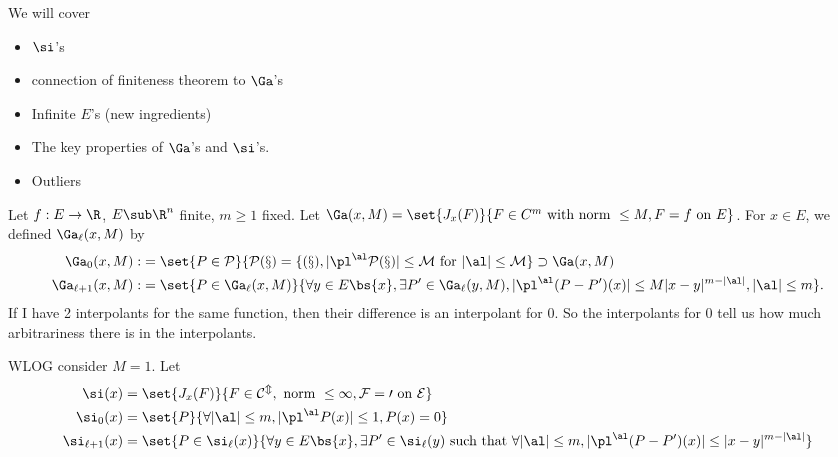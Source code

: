 
We will cover
\begin{itemize}
\item
$\si$'s
\item
connection of finiteness theorem to $\Ga$'s
\item
Infinite $E$'s (new ingredients)
\item
The key properties of $\Ga$'s and $\si$'s.
\item 
Outliers
\end{itemize}

Let $f:E\to \R$, $E\sub \R^n$ finite, $m\ge 1$ fixed. Let $\Ga(x,M) = \set{J_x(F)}{F\in C^m \text{ with norm }\le M, F=f\text{ on }E}$. For $x\in E$, we defined $\Ga_\ell (x,M)$ by 
\begin{align}
\Ga_0(x,M) :&= \set{P\in \cal P}{P(x)=f(x), |\pl^\al P(x)|\le M\text{ for }|\al|\le M}\supset \Ga(x,M)\\
\Ga_{\ell+1}(x,M) :&= 
\set{P\in \Ga_\ell(x,M)}{\forall y\in E\bs \{x\}, \exists P'\in \Ga_\ell(y,M), |\pl^\al(P-P')(x)|\le M|x-y|^{m-|\al|}, |\al|\le m}.
\end{align}
If I have 2 interpolants for the same function, then their difference is an interpolant for 0. So the interpolants for 0 tell us how much arbitrariness there is in the interpolants. 

WLOG consider $M=1$.
Let 
\begin{align}
\si(x) &= \set{J_x(F)}{F\in \cal C^m, \text{ norm }\le 1, F=0\text{ on }E}\\
\si_0(x) &=\set{P}{\forall |\al|\le m,|\pl^\al P(x)|\le 1, P(x)=0}\\
\si_{\ell+1}(x)&=\set{P\in \si_\ell(x)}{\forall y\in E\bs \{x\}, \exists P'\in \si_\ell(y)\text{ such that }\forall |\al|\le m, |\pl^\al(P-P')(x)|\le |x-y|^{m-|\al|}}
\end{align}

